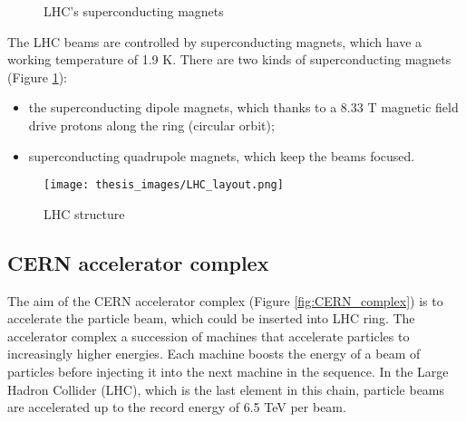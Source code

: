 \documentclass[a4paper, oneside, 11pt, openright]{book}
\begin{document}
				\begin{figure}[H]
					\centering
					 \quad
					\caption{LHC's superconducting magnets}
					\label{fig:magnets}
				\end{figure}
				
				The LHC beams are controlled by superconducting magnets, which have a working temperature of 1.9 K. There are two kinds of superconducting magnets (Figure \ref{fig:magnets}):
				\begin{itemize}
					\item the superconducting dipole magnets, which thanks to a 8.33 T magnetic field drive protons along the ring (circular orbit);
					\item superconducting quadrupole magnets, which keep the beams focused.
				\end{itemize} 
				
				
				\begin{figure}[H]
					\centering
					\texttt{[image: thesis\_images/LHC\_layout.png]}
					\caption{LHC structure}
					\label{fig:LHC_layout}
				\end{figure}
			
			\subsection{CERN accelerator complex}
				The aim of the CERN accelerator complex (Figure \ref{fig:CERN_complex}) is to accelerate the particle beam, which could be inserted into LHC ring. The accelerator complex a succession of machines that accelerate particles to increasingly higher energies. Each machine boosts the energy of a beam of particles before injecting it into the next machine in the sequence. In the Large Hadron Collider (LHC), which is the last element in this chain, particle beams are accelerated up to the record energy of 6.5 TeV per beam.
				
\end{document}
